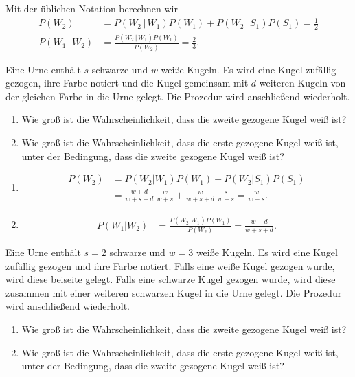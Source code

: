 \solution
Mit der üblichen Notation berechnen wir
\begin{align*}
    P(W_2) &= P( W_2 \,|\, W_1 ) P(W_1) + P(W_2 \,|\, S_1) P(S_1) = \frac{1}{2}\\
    P(W_1 \,|\, W_2 ) &= \frac{ P(W_2 \,|\, W_1 ) P( W_1 )  }{ P(W_2) } = \frac{2}{3}. 
\end{align*}

 Eine Urne
enthält $s$ schwarze und $w$ weiße Kugeln. Es wird eine Kugel zufällig gezogen,
ihre Farbe notiert und die Kugel gemeinsam mit $d$ weiteren Kugeln von der
gleichen Farbe in die Urne gelegt. Die Prozedur wird anschließend wiederholt. 
\begin{enumerate}
    \item Wie groß ist die Wahrscheinlichkeit, dass die zweite gezogene Kugel weiß ist?
    \item Wie groß ist die Wahrscheinlichkeit, dass die erste gezogene Kugel
        weiß ist, unter der Bedingung, dass die zweite gezogene Kugel weiß ist?
\end{enumerate}

\solution
\begin{enumerate}
    \item \begin{align*}
            P(W_2) &= P(W_2 | W_1) P(W_1) + P(W_2 | S_1) P(S_1) \\
            &= \frac{w+d}{w+s+d}\ \frac{w}{w+s} + \frac{w}{w+s+d}\ \frac{s}{w+s} = \frac{w}{w+s}.
        \end{align*}

    \item \begin{align*}
            P(W_1 | W_2 ) &= \frac{ P(W_2 | W_1) P(W_1)  }{ P(W_2) } = \frac{w+d}{w+s+d}.
        \end{align*}
        
\end{enumerate}


 Eine Urne enthält $s=2$ schwarze und
$w=3$ weiße Kugeln. Es wird eine Kugel zufällig gezogen und ihre Farbe notiert.
Falls eine weiße Kugel gezogen wurde, wird diese beiseite gelegt. Falls eine
schwarze Kugel gezogen wurde, wird diese zusammen mit einer weiteren schwarzen
Kugel in die Urne gelegt. Die Prozedur wird anschließend wiederholt.
\begin{enumerate}
    \item Wie groß ist die Wahrscheinlichkeit, dass die zweite gezogene Kugel
        weiß ist?
    \item Wie groß ist die Wahrscheinlichkeit, dass die erste gezogene Kugel
        weiß ist, unter der Bedingung, dass die zweite gezogene Kugel weiß ist?
\end{enumerate}

